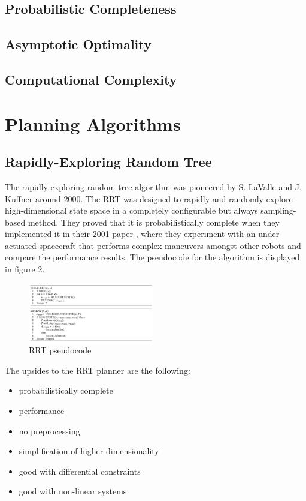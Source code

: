 \documentclass[conference]{IEEEtran} \usepackage[T1]{fontenc} \usepackage[backend=biber, style=ieee]{biblatex}
\begin{document}
\subsection{Probabilistic Completeness} \label{Probabilistic Completeness}

\subsection{Asymptotic Optimality} \label{Asymptotic Optimality}

\subsection{Computational Complexity} \label{Computational Complexity}

\section{Planning Algorithms} \label{Planning Algorithms}

\subsection{Rapidly-Exploring Random Tree} \label{RRT}
The rapidly-exploring random tree algorithm was pioneered by S. LaValle and J. Kuffner around 2000. The RRT was designed to rapidly and randomly explore high-dimensional
state space in a completely configurable but always sampling-based method. They proved that it is probabilistically complete when they implemented it in their 2001 paper 
\cite{random_kinodynamics}, where they experiment with an under-actuated spacecraft that performs complex maneuvers amongst other robots and compare the performance 
results. The pseudocode for the algorithm is displayed in figure 2.

\begin{figure}
\label{figure2} 
\centering 
\includegraphics[width=0.49\textwidth]{rrt}
\caption{RRT pseudocode}
\end{figure}

The upsides to the RRT planner are the following:
\begin{itemize}
\item probabilistically complete
\item performance
\item no preprocessing
\item simplification of higher dimensionality
\item good with differential constraints
\item good with non-linear systems
\end{itemize}
\end{document}
